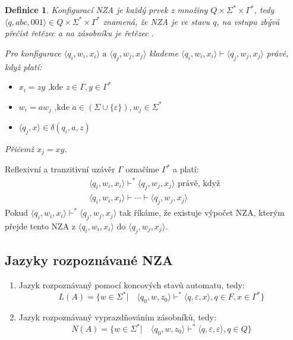 \documentclass[10pt, a4paper, titlepage]{article}
\theoremstyle{note}
\newtheorem{definice}{\textbf{Definice}}
\begin{document}
\begin{definice}
Konfigurac\'i NZA je každ\'y prvek z množiny $Q \times \Sigma^* \times \Gamma^*$, tedy
$\langle q, abc, 001 \rangle \in Q \times \Sigma^* \times \Gamma^*$ znamená, že NZA je ve stavu $q$, na vstupu
zbývá přečíst řetězec  a na zásobníku je řetězec .

Pro konfigurace $\langle q_i, w_i, x_i \rangle \text{ a } \langle q_j, w_j, x_j \rangle$ klademe 
$\langle q_i, w_i, x_i \rangle \vdash \langle q_j, w_j, x_j \rangle$ právě, když platí:
\begin{itemize}
\item
$x_i = zy \text{ ,kde } z \in \Gamma, y \in \Gamma^*$

\item
$w_i = aw_j \text{ ,kde } a \in (\Sigma \cup \lbrace \varepsilon \rbrace), w_j \in \Sigma^*$

\item
$\langle q_j, x \rangle \in \delta(q_i, a, z)$
\end{itemize}
Přičemž $x_j = xy$.
\end{definice}

Reflexivní a tranzitivní uzávěr $\Gamma$ označíme $\Gamma^*$ a platí:
\begin{gather*}
\langle q_i, w_i, x_i \rangle \vdash^* \langle q_j, w_j, x_j \rangle \text{ právě, když} \\
\langle q_i, w_i, x_i \rangle \vdash \cdots \vdash \langle q_j, w_j, x_j \rangle
\end{gather*}
Pokud $\langle q_i, w_i, x_i \rangle \vdash^* \langle q_j, w_j, x_j \rangle$ tak říkáme, že existuje výpočet
NZA, kterým přejde tento NZA z $\langle q_i, w_i, x_i \rangle \text{ do } \langle q_j, w_j, x_j \rangle$.

\subsection{Jazyky rozpoznávané NZA}
\begin{enumerate}
\item
Jazyk rozpoznávaný pomocí koncových stavů automatu, tedy:
$$
L(A) = \lbrace w \in \Sigma^* | \quad \langle q_0, w, z_0 \rangle \vdash^* \langle q, \varepsilon, x \rangle, q \in F, x \in \Gamma^* \rbrace
$$

\item
Jazyk rozpoznávaný vyprazdňováním zásobníků, tedy:
$$
N(A) = \lbrace w \in \Sigma^* | \quad \langle q_0, w, z_0 \rangle \vdash^* \langle q, \varepsilon, \varepsilon \rangle, q \in Q \rbrace
$$
\end{enumerate}
\end{document}
